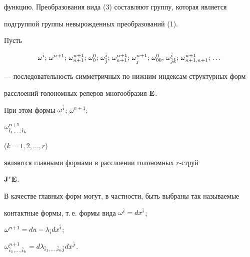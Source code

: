 функцию. Преобразования вида (3) составляют группу, которая является 


подгруппой группы невырожденных преобразований (1). 


 


Пусть 


\begin{equation} 


\omega^{\Hat i};\,\omega^{n+1};\,\omega^{n+1}_{n+1};\, 


\omega^0_0;\,\omega^{\Hat i}_{\Hat j};\,\omega^{n+1}_{n+1};\, 


\omega^{n+1}_{\Hat j};\,\omega^0_{00},\, 


\omega^{\Hat i}_{\Hat j\Hat k};\, 


\omega^{n+1}_{n+1,n+1};\,\dotsc 


\end{equation} 


--- последовательность симметричных по нижним индексам структурных форм  


расслоений голономных реперов многообразия $\bold E$. 


При этом формы $\omega^{\Hat i}$; $\omega^{n+1}$; 


$\omega^{n+1}_{\Hat i_1,\dotsc,\Hat i_k}$ 


($k=1,2,\dotsc,r$) 


являются главными формами в расслоении голономных $r$-струй 


$\bold J^r\bold E$. 


В качестве главных форм могут, в частности, быть выбраны так называемые 


контактные формы, т.\,е. формы вида $\omega^{\Hat i}=dx^{\hat i}$; 


$\omega^{n+1}=du-\lambda_{\Hat i}dx^{\Hat i}$; 


$\omega^{n+1}_{\Hat i_1,\dotsc,\Hat i_k}= 


d\lambda_{\Hat i_1,\dotsc,\Hat i_k\Hat j}dx^{\Hat j}$. 


 


